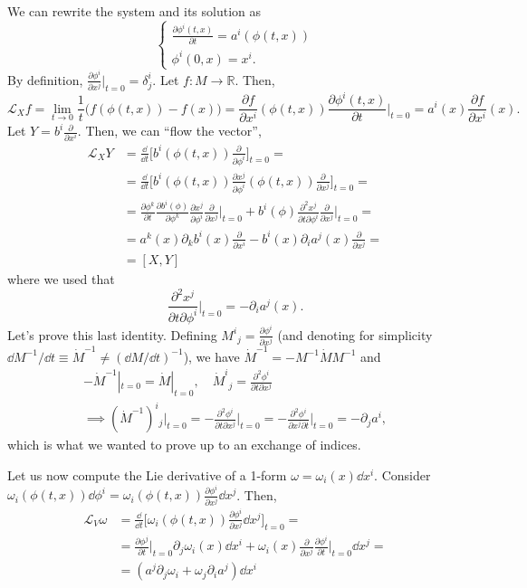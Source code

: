 \documentclass[a4paper,12pt]{book}
\begin{document}
We can rewrite the system and its solution as
\[\begin{cases}
\frac{\partial \phi^i(t,x)}{\partial t}=a^i(\phi(t,x))\\
\phi^i(0,x)=x^i.
\end{cases}\]
By definition, $\frac{\partial \phi^i}{\partial x^j}\big|_{t=0}=\delta^i_j$. Let $f\colon M\to\mathbb R$. Then,
\[\mathcal L_Xf=\lim_{t\to 0}\frac1t\bigl(f(\phi(t,x))-f(x)\bigr)=\frac{\partial f}{\partial x^i}(\phi(t,x))\frac{\partial\phi^i(t,x)}{\partial t}\bigg|_{t=0}=a^i(x)\frac{\partial f}{\partial x^i}(x).\]
Let $Y=b^i\frac{\partial}{\partial x^i}$. Then, we can ``flow the vector'',
\begin{align*}
\mathcal L_XY&=\frac{\dd}{\dd t}\biggl[b^i(\phi(t,x))\frac{\partial}{\partial \phi^i}\biggr]_{t=0}=\\
&=\frac{\dd}{\dd t}\biggl[b^i(\phi(t,x))\frac{\partial x^j}{\partial \phi^i}(\phi(t,x))\frac{\partial}{\partial x^j}\biggr]_{t=0}=\\
&=\frac{\partial\phi^k}{\partial t}\frac{\partial b^i(\phi)}{\partial \phi^k}\frac{\partial x^j}{\partial \phi^i}\frac{\partial}{\partial x^j}\bigg|_{t=0}+b^i(\phi)\frac{\partial^2x^j}{\partial t\partial \phi^i}\frac{\partial}{\partial x^j}\bigg|_{t=0}=\\
&=a^k(x)\partial_kb^i(x)\frac{\partial}{\partial x^i}-b^i(x)\partial_ia^j(x)\frac{\partial}{\partial x^j}=\\
&=[X,Y]\end{align*}
where we used that
\[\frac{\partial^2x^j}{\partial t\partial \phi^i}\bigg|_{t=0}=-\partial_ia^j(x).\]
Let's prove this last identity. Defining $M^i{}_j=\frac{\partial\phi^i}{\partial x^j}$ (and denoting for simplicity $\dd M^{-1}/\dd t\equiv\dot M^{-1}\ne (\dd M/\dd t)^{-1}$), we have $\dot M^{-1}=-M^{-1}\dot M M^{-1}$ and
\begin{gather*}-\dot M^{-1}|_{t=0}=\dot M|_{t=0},\quad\dot M^i{}_j=\frac{\partial^2\phi^i}{\partial t\partial x^j}\\
\implies (\dot M^{-1})^i{}_j\big|_{t=0}=-\frac{\partial^2\phi^i}{\partial t\partial x^j}\bigg|_{t=0}=-\frac{\partial^2\phi^i}{\partial x^j\partial t}\bigg|_{t=0}=-\partial_ja^i,\end{gather*}
which is what we wanted to prove up to an exchange of indices.

Let us now compute the Lie derivative of a 1-form $\omega=\omega_i(x)\dd x^i$. Consider $\omega_i(\phi(t,x))\dd \phi^i=\omega_i(\phi(t,x))\frac{\partial\phi^i}{\partial x^j}\dd x^j$. Then,
\begin{align*}
\mathcal L_V\omega&=\frac{\dd}{\dd t}\biggl[\omega_i(\phi(t,x))\frac{\partial\phi^i}{\partial x^j}\dd x^j\biggr]_{t=0}=\\
&=\frac{\partial\phi^j}{\partial t}\bigg|_{t=0}\partial_j\omega_i(x)\dd x^i+\omega_i(x)\frac{\partial}{\partial x^j}\frac{\partial\phi^i}{\partial t}\bigg|_{t=0}\dd x^j=\\
&=(a^j\partial_j\omega_i+\omega_j\partial_ia^j)\dd x^i
\end{align*}
\end{document}
